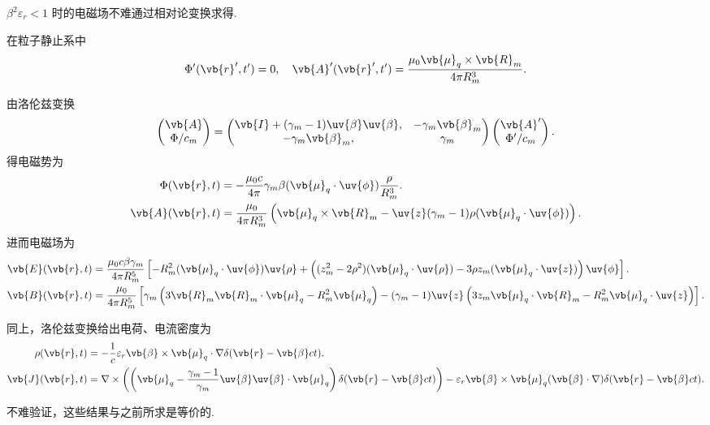 \begin{note}
	\(\beta^{2} \varepsilon_{r} < 1\) 时的电磁场不难通过相对论变换求得.

	在粒子静止系中
	\begin{align*}
		\Phi'(\vb{r}', t') = 0, \quad
		\vb{A}'(\vb{r}', t') = \frac{\mu_{0} \vb{\mu}_{q} \times \vb{R}_{m}}{4\pi R_{m}^{3}}.
	\end{align*}

	由洛伦兹变换
	\begin{align*}
		\begin{pmatrix}
			\vb{A} \\
			\Phi/c_{m}
		\end{pmatrix} =
		\begin{pmatrix}
			\vb{I} + (\gamma_{m} - 1) \uv{\beta} \uv{\beta}, & -\gamma_{m} \vb{\beta}_{m} \\
			-\gamma_{m} \vb{\beta}_{m},                      & \gamma_{m}
		\end{pmatrix}
		\begin{pmatrix}
			\vb{A}' \\
			\Phi'/c_{m}
		\end{pmatrix}.
	\end{align*}
	得电磁势为
	\begin{align*}
		\Phi(\vb{r}, t) &= -\frac{\mu_{0} c}{4\pi} \gamma_{m} \beta (\vb{\mu}_{q} \cdot \uv{\phi}) \frac{\rho}{R_{m}^{3}}. \\
		\vb{A}(\vb{r}, t) &= \frac{\mu_{0}}{4\pi R_{m}^{3}} \left( \vb{\mu}_{q} \times \vb{R}_{m} - \uv{z} (\gamma_{m} - 1) \rho (\vb{\mu}_{q} \cdot \uv{\phi}) \right).
	\end{align*}
	进而电磁场为
	\begin{align*}
		\vb{E}(\vb{r}, t) &= \frac{\mu_{0} c \beta \gamma_{m}}{4\pi R_{m}^{5}} \left[ -R_{m}^{2} (\vb{\mu}_{q} \cdot \uv{\phi}) \uv{\rho} + \left( (z_{m}^{2} - 2\rho^{2}) (\vb{\mu}_{q} \cdot \uv{\rho}) - 3 \rho z_{m} (\vb{\mu}_{q} \cdot \uv{z}) \right) \uv{\phi} \right]. \\
		\vb{B}(\vb{r}, t) &= \frac{\mu_{0}}{4\pi R_{m}^{5}} \left[ \gamma_{m} \left( 3 \vb{R}_{m} \vb{R}_{m} \cdot \vb{\mu}_{q} - R_{m}^{2} \vb{\mu}_{q} \right) - (\gamma_{m} - 1) \uv{z} \left( 3 z_{m} \vb{\mu}_{q} \cdot \vb{R}_{m} - R_{m}^{2} \vb{\mu}_{q} \cdot \uv{z} \right) \right].
	\end{align*}

	同上，洛伦兹变换给出电荷、电流密度为
	\begin{align*}
		\rho(\vb{r}, t) &= -\frac{1}{c} \varepsilon_{r} \vb{\beta} \times \vb{\mu}_{q} \cdot \nabla \delta(\vb{r} - \vb{\beta} c t). \\
		\vb{J}(\vb{r}, t) &= \nabla \times \left( \left( \vb{\mu}_{q} - \frac{\gamma_{m} - 1}{\gamma_{m}} \uv{\beta} \uv{\beta} \cdot \vb{\mu}_{q} \right) \delta(\vb{r} - \vb{\beta} c t) \right) - \varepsilon_{r} \vb{\beta} \times \vb{\mu}_{q} (\vb{\beta} \cdot \nabla) \delta(\vb{r} - \vb{\beta} c t).
	\end{align*}

	不难验证，这些结果与之前所求是等价的.

\end{note}

